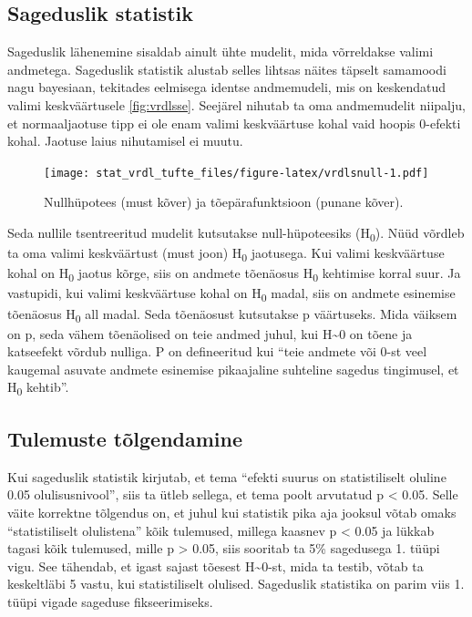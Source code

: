 \documentclass[]{book}
\begin{document}
\hypertarget{sageduslik-statistik-1}{%
\subsection*{Sageduslik statistik}\label{sageduslik-statistik-1}}

Sageduslik lähenemine sisaldab ainult ühte mudelit, mida võrreldakse valimi andmetega.
Sageduslik statistik alustab selles lihtsas näites täpselt samamoodi nagu bayesiaan, tekitades eelmisega identse andmemudeli, mis on keskendatud valimi keskväärtusele \ref{fig:vrdlsse}.
Seejärel nihutab ta oma andmemudelit niipalju, et normaaljaotuse tipp ei ole enam valimi keskväärtuse kohal vaid hoopis 0-efekti kohal. Jaotuse laius nihutamisel ei muutu.

\begin{figure}
\centering
\texttt{[image: stat\_vrdl\_tufte\_files/figure-latex/vrdlsnull-1.pdf]}
\caption{\label{fig:vrdlsnull}Nullhüpotees (must kõver) ja tõepärafunktsioon (punane kõver).}
\end{figure}

Seda nullile tsentreeritud mudelit kutsutakse null-hüpoteesiks (H\textsubscript{0}).
Nüüd võrdleb ta oma valimi keskväärtust (must joon) H\textsubscript{0} jaotusega.
Kui valimi keskväärtuse kohal on H\textsubscript{0} jaotus kõrge, siis on andmete tõenäosus H\textsubscript{0} kehtimise korral suur.
Ja vastupidi, kui valimi keskväärtuse kohal on H\textsubscript{0} madal, siis on andmete esinemise tõenäosus H\textsubscript{0} all madal.
Seda tõenäosust kutsutakse p väärtuseks.
Mida väiksem on p, seda vähem tõenäolised on teie andmed juhul, kui H\textasciitilde{}0 on tõene ja katseefekt võrdub nulliga.
P on defineeritud kui ``teie andmete või 0-st veel kaugemal asuvate andmete esinemise pikaajaline suhteline sagedus tingimusel, et H\textsubscript{0} kehtib''.

\hypertarget{tulemuste-tolgendamine-1}{%
\subsection*{Tulemuste tõlgendamine}\label{tulemuste-tolgendamine-1}}

Kui sageduslik statistik kirjutab, et tema ``efekti suurus on statistiliselt oluline 0.05 olulisusnivool'', siis ta ütleb sellega, et tema poolt arvutatud p \textless{} 0.05.
Selle väite korrektne tõlgendus on, et juhul kui statistik pika aja jooksul võtab omaks ``statistiliselt olulistena'' kõik tulemused, millega kaasnev p \textless{} 0.05 ja lükkab tagasi kõik tulemused, mille p \textgreater{} 0.05, siis sooritab ta 5\% sagedusega 1. tüüpi vigu.
See tähendab, et igast sajast tõesest H\textasciitilde{}0-st, mida ta testib, võtab ta keskeltläbi 5 vastu, kui statistiliselt olulised.
Sageduslik statistika on parim viis 1. tüüpi vigade sageduse fikseerimiseks.
\end{document}
